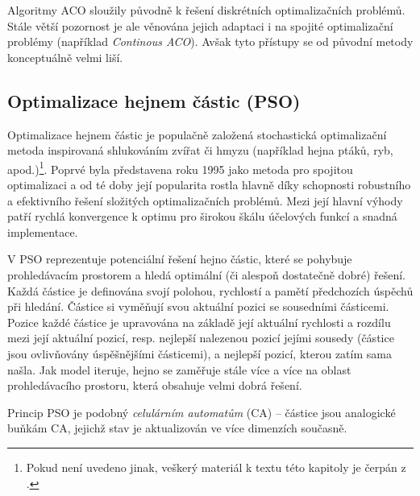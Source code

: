 \documentclass[a4paper,12pt]{article}
\begin{document}
Algoritmy ACO sloužily původně k řešení diskrétních optimalizačních problémů. Stále větší pozornost je
ale věnována jejich adaptaci i na spojité optimalizační problémy (například {\it Continous ACO}).
Avšak tyto přístupy se od původní metody konceptuálně velmi liší.


\subsection{Optimalizace hejnem částic (PSO)}
Optimalizace hejnem částic je populačně založená stochastická optimalizační metoda inspirovaná
shlukováním zvířat či hmyzu (například hejna ptáků, ryb, apod.)\footnote{Pokud není uvedeno jinak,
veškerý materiál k textu této kapitoly je čerpán z \cite{Blum08SwarmOpt}.}.
Poprvé byla představena roku 1995 jako metoda pro spojitou optimalizaci a od té doby
její popularita rostla hlavně díky schopnosti robustního a efektivního řešení složitých optimalizačních problémů.
Mezi její hlavní výhody patří rychlá konvergence k optimu pro širokou škálu účelových funkcí a snadná implementace.

V PSO reprezentuje potenciální řešení hejno částic, které se pohybuje prohledávacím prostorem a hledá
optimální (či alespoň dostatečně dobré) řešení. Každá částice je definována svojí polohou, rychlostí a pamětí
předchozích úspěchů při hledání. Částice si vyměňují svou aktuální pozici se sousedními částicemi.
Pozice každé částice je upravována na základě její aktuální rychlosti a rozdílu mezi její aktuální pozicí, resp.
nejlepší nalezenou pozicí jejími sousedy (částice jsou ovlivňovány úspěšnějšími částicemi), a nejlepší pozicí,
kterou zatím sama našla. Jak model iteruje, hejno se zaměřuje stále více a více na oblast prohledávacího
prostoru, která obsahuje velmi dobrá řešení.

Princip PSO je podobný {\it celulárním automatům} (CA) -- částice jsou analogické buňkám CA, jejichž stav je
aktualizován ve více dimenzích současně.
\end{document}
